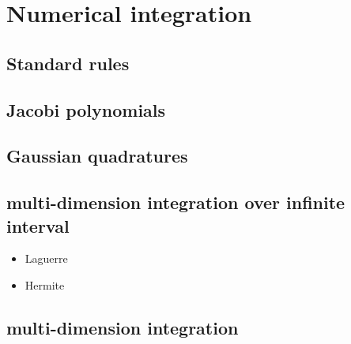 \begin{frame}{}
  
\end{frame}


\section{Numerical integration}
\label{sec:numer-integr}

\subsection{Standard rules}
\label{sec:standard-rules}

\begin{frame}{}
  
\end{frame}

\subsection{Jacobi polynomials}
\label{sec:jacobi-polynomials}

\begin{frame}{}
  
\end{frame}

\subsection{Gaussian quadratures}
\label{sec:gaussian-quadratures}

\begin{frame}{}
  
\end{frame}

\subsection{multi-dimension integration over infinite interval}
\label{sec:multi-dimens-integr}

\begin{frame}{}
  \begin{itemize}
  \item Laguerre
  \item Hermite
  \end{itemize}
\end{frame}


\subsection{multi-dimension integration}
\label{sec:multi-dimens-integr}

